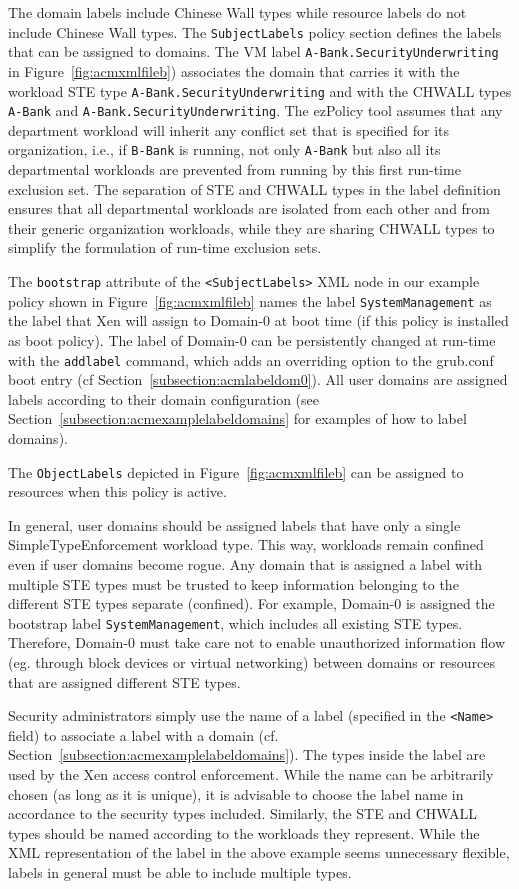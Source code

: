\documentclass[11pt,twoside,final,openright]{report}
\begin{document}
The domain labels include
Chinese Wall types while resource labels do not include Chinese Wall types.
The \verb|SubjectLabels| policy section defines the labels that can be
assigned to domains. The VM label
\verb|A-Bank.SecurityUnderwriting| in Figure~\ref{fig:acmxmlfileb})
associates the domain that carries it with the workload STE type
\verb|A-Bank.SecurityUnderwriting| and with the CHWALL types \verb|A-Bank|
and \verb|A-Bank.SecurityUnderwriting|. The ezPolicy tool
assumes that any department workload will inherit any conflict set that
is specified for its organization, i.e., if \verb|B-Bank| is running, not
only \verb|A-Bank| but also all its departmental workloads are prevented
from running by this first run-time exclusion set. The separation of STE
and CHWALL types in the label definition ensures that
all departmental workloads are isolated from each other and from their generic
organization workloads, while they are sharing CHWALL types to
simplify the formulation of run-time exclusion sets.

The \verb|bootstrap| attribute of the \verb|<SubjectLabels>| XML node
in our example policy shown in Figure~\ref{fig:acmxmlfileb} names
the label \verb|SystemManagement| as the label that Xen will assign
to Domain-0 at boot time (if this policy is installed as boot policy). The
label of Domain-0 can be persistently changed at run-time with the
\verb|addlabel| command, which adds an overriding option to the grub.conf
boot entry (cf Section~\ref{subsection:acmlabeldom0}).
All user domains are assigned labels according to their domain configuration
(see Section~\ref{subsection:acmexamplelabeldomains} for examples of
how to label domains).

The \verb|ObjectLabels| depicted in Figure~\ref{fig:acmxmlfileb} can be
assigned to resources when this policy is active.

In general, user domains should be assigned labels that have only a
single SimpleTypeEnforcement workload type. This way, workloads remain
confined even if user domains become rogue. Any domain that is
assigned a label with multiple STE types must be trusted to keep
information belonging to the different STE types separate (confined).
For example, Domain-0 is assigned the bootstrap label
\verb|SystemManagement|, which includes all existing STE types.
Therefore, Domain-0 must take care not to enable unauthorized
information flow (eg. through block devices or virtual networking)
between domains or resources that are assigned different STE types.

Security administrators simply use the name of a label (specified in
the \verb|<Name>| field) to associate a label with a domain (cf.
Section~\ref{subsection:acmexamplelabeldomains}). The types inside the
label are used by the Xen access control enforcement.  While the name
can be arbitrarily chosen (as long as it is unique), it is advisable
to choose the label name in accordance to the security types included.
Similarly, the STE and CHWALL types should be named according to the
workloads they represent. While the XML representation of the label
in the above example seems unnecessary flexible, labels in general
must be able to include multiple types.
\end{document}
